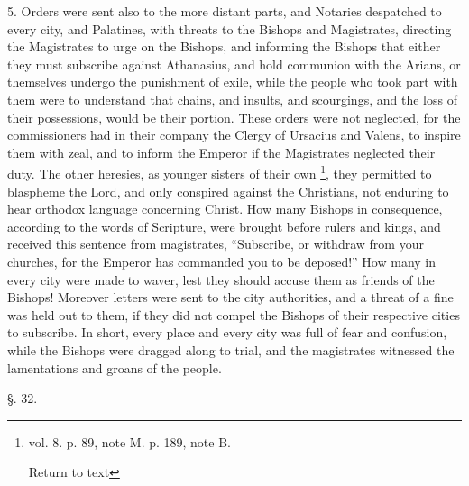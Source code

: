 5. Orders were sent also to the more distant
parts, and Notaries despatched to every city, and Palatines,
with threats to the Bishops and Magistrates, directing the Magistrates
to urge on the Bishops, and informing the Bishops that either they
must subscribe against Athanasius, and hold communion with the Arians,
or themselves undergo the punishment of exile, while the people who
took part with them were to understand that chains, and insults, and
scourgings, and the loss of their possessions, would be their portion.
These orders were not neglected, for the commissioners had in their
company the Clergy of Ursacius and Valens, to inspire them with zeal,
and to inform the Emperor if the Magistrates neglected their duty. The
other heresies, as younger sisters of their own \footnote{vol. 8. p. 89, note M. p. 189, note B.

Return to text}, they permitted to blaspheme the Lord, and only conspired
against the Christians, not enduring to hear orthodox language
concerning Christ. How many Bishops in consequence, according to the
words of Scripture, were brought before rulers and kings, and received
this sentence from magistrates, ``Subscribe, or withdraw from your
churches, for the Emperor has commanded you to be deposed!'' How many
in every city were made to waver, lest they should accuse them as
friends of the Bishops! Moreover letters were sent to the city
authorities, and a threat of a fine was held out to them, if they did
not compel the Bishops of their respective cities to subscribe. In
short, every place and every city was full of fear and confusion,
while the Bishops were dragged along to trial, and the magistrates
witnessed the lamentations and groans of the people.

§. 32.

